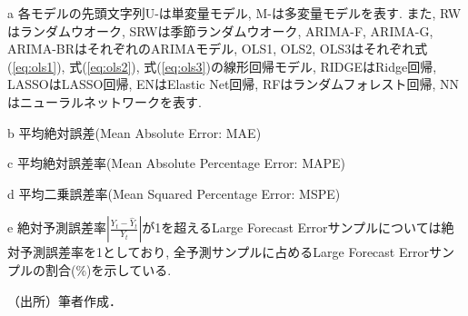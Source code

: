 \begin{threeparttable}
\begin{tablenotes}
\item[a] 各モデルの先頭文字列U-は単変量モデル, M-は多変量モデルを表す. また, RWはランダムウオーク, SRWは季節ランダムウオーク, ARIMA-F, ARIMA-G, ARIMA-BRはそれぞれ\cite*{foster1977quarterly, griffin1977time, brown1979univariate}のARIMAモデル, OLS1, OLS2, OLS3はそれぞれ式(\ref{eq:ols1}), 式(\ref{eq:ols2}), 式(\ref{eq:ols3})の線形回帰モデル, RIDGEはRidge回帰, LASSOはLASSO回帰, ENはElastic Net回帰, RFはランダムフォレスト回帰, NNはニューラルネットワークを表す.
\item[b] 平均絶対誤差(Mean Absolute Error: MAE)
\item[c] 平均絶対誤差率(Mean Absolute Percentage Error: MAPE)
\item[d] 平均二乗誤差率(Mean Squared Percentage Error: MSPE)
\item[e] 絶対予測誤差率$\left| \frac{Y_t -{\hat Y}_t}{Y_t} \right|$が1を超えるLarge Forecast Errorサンプルについては絶対予測誤差率を1としており, 全予測サンプルに占めるLarge Forecast Errorサンプルの割合(\%)を示している.
\item[] （出所）筆者作成．
\end{tablenotes}
\end{threeparttable}  